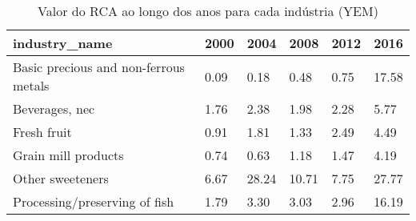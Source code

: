 \begin{table}
\centering
\caption{Valor do RCA ao longo dos anos para cada indústria (YEM)}
\begin{tabular}{p{6cm}p{1.5cm}p{1.5cm}p{1.5cm}p{1.5cm}p{1.5cm}}
\toprule
                        industry\_name & 2000 &  2004 &  2008 & 2012 &  2016 \\
\midrule
Basic precious and non-ferrous metals & 0.09 &  0.18 &  0.48 & 0.75 & 17.58 \\
                       Beverages, nec & 1.76 &  2.38 &  1.98 & 2.28 &  5.77 \\
                          Fresh fruit & 0.91 &  1.81 &  1.33 & 2.49 &  4.49 \\
                  Grain mill products & 0.74 &  0.63 &  1.18 & 1.47 &  4.19 \\
                     Other sweeteners & 6.67 & 28.24 & 10.71 & 7.75 & 27.77 \\
        Processing/preserving of fish & 1.79 &  3.30 &  3.03 & 2.96 & 16.19 \\
\bottomrule
\end{tabular}
\end{table}
